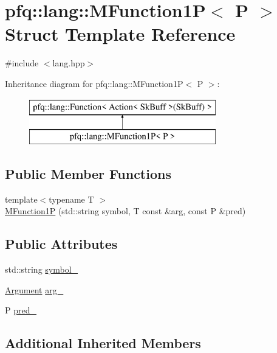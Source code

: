 \hypertarget{structpfq_1_1lang_1_1MFunction1P}{\section{pfq\+:\+:lang\+:\+:M\+Function1\+P$<$ P $>$ Struct Template Reference}
\label{structpfq_1_1lang_1_1MFunction1P}
}


{\ttfamily \#include $<$lang.\+hpp$>$}

Inheritance diagram for pfq\+:\+:lang\+:\+:M\+Function1\+P$<$ P $>$\+:\begin{figure}[H]
\begin{center}
\leavevmode
\includegraphics[height=2.000000cm]{structpfq_1_1lang_1_1MFunction1P}
\end{center}
\end{figure}
\subsection*{Public Member Functions}
\begin{DoxyCompactItemize}
\item 
{\footnotesize template$<$typename T $>$ }\\\hyperlink{structpfq_1_1lang_1_1MFunction1P_afc36837a938f20fb6b71bff9cc057db9}{M\+Function1\+P} (std\+::string symbol, T const \&arg, const P \&pred)
\end{DoxyCompactItemize}
\subsection*{Public Attributes}
\begin{DoxyCompactItemize}
\item 
std\+::string \hyperlink{structpfq_1_1lang_1_1MFunction1P_a23f2aa86429240320e676f185cee857e}{symbol\+\_\+}
\item 
\hyperlink{structpfq_1_1lang_1_1Argument}{Argument} \hyperlink{structpfq_1_1lang_1_1MFunction1P_a1fe2d616ed9b95dca4df3afd789f67a1}{arg\+\_\+}
\item 
P \hyperlink{structpfq_1_1lang_1_1MFunction1P_aaf4704c14197b82e61b5ddb8ff87b46f}{pred\+\_\+}
\end{DoxyCompactItemize}
\subsection*{Additional Inherited Members}


